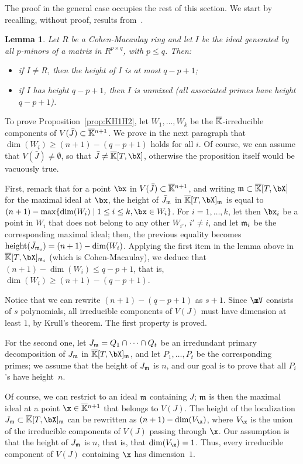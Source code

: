\documentclass[12pt]{article}
\newtheorem{lemma}[definition]{Lemma}
\begin{document}
The proof in the general case occupies the rest of this section. We start by
recalling, without proof, results from~\cite[Section~6]{EN62}.

\begin{lemma}\label{lemma:EN}
  Let $R$ be a Cohen-Macaulay ring and let $I$ be the ideal generated
  by all $p$-minors of a matrix in $R^{p\times q}$,
  with $p \le q$. Then:
  \begin{itemize}
  \item if $I \ne R$, then the height of $I$ is at most $q-p+1$;
  \item if $I$ has height $q-p+1$, then $I$ is unmixed (all associated
    primes have height $q-p+1$).
\end{itemize}
\end{lemma}

To prove Proposition~\ref{prop:KH1H2}, let $W_1,\dots,W_k$ be the
$\overline{\mathbb{K}}$-irreducible components of $V(\bar J)\subset
\overline{\mathbb{K}}{}^{n+1}$. We prove in the next paragraph that $\dim(W_i) \ge
(n+1) -(q-p+1)$ holds for all $i$. Of course, we can assume that
$V(\bar J)\ne \emptyset$, so that $\bar J \ne \KKbar[T,\bX]$, otherwise the
proposition itself would be vacuously true.

First, remark that for a point $\bx$ in $V(\bar J)\subset \overline{\mathbb{K}}{}^{n+1}$, and
writing $\m \subset \KKbar[T,\bX]$ for the maximal ideal at $\bx$, the height of
$\bar J_{\mathfrak{m}}$ in $\KKbar[T,\bX]_\m$ is equal to $(n+1)-\max\{ \dim(W_i) \mid 1 \le i
\le k, \bx \in W_i\}$. For $i=1,\dots,k$, let then $\bx_i$ be a point in $W_i$
that does not belong to any other $W_{i'}$, $i' \ne i$, and let $\mathfrak{m}_i$ be the
corresponding maximal ideal; then, the previous equality becomes ${\rm
  height}(\bar J_{\mathfrak{m}_i})=(n+1)-\dim(W_i)$. Applying the first item in the lemma above
in $\KKbar[T,\bX]_{\m_i}$ (which is Cohen-Macaulay), we deduce that
$(n+1)-\dim(W_i) \le q-p+1$, that is, $\dim(W_i) \ge (n+1) -(q-p+1)$.

Notice that we can rewrite $(n+1)-(q-p+1)$ as $s+1$.  Since $\mV$
consists of $s$ polynomials, all irreducible components of $V(J)$ must
have dimension at least $1$, by Krull's theorem. The first property
 is proved.

For the second one, let $J_{\mathfrak{m}}=Q_1 \cap \cdots \cap Q_t$ be an
irredundant primary decomposition of $J_{\mathfrak{m}}$ in $\KKbar[T,\bX]_\m$, and
let $P_1,\dots,P_t$ be the corresponding primes; we assume that the
height of $J_{\mathfrak{m}}$ is $n$, and our goal is to prove that all $P_i$'s
have height~$n$.

Of course, we can restrict to an ideal $\mathfrak{m}$ containing $J$; $\mathfrak{m}$ is
then the maximal ideal at a point $\x \in \KKbar{}^{n+1}$ that belongs
to $V(J)$. The height of the localization
$J_\m \subset \KKbar[T,\bX]_\m$ can be rewritten as
$(n+1)-\dim(V_\x)$, where $V_\x$ is the union of the irreducible
components of $V(J)$ passing through $\x$. Our assumption 
is that the height of $J_{\mathfrak{m}}$ is $n$, that is, that
$\dim(V_\x)=1$. Thus, every irreducible component of $V(J)$ containing
$\x$ has dimension~$1$.
\end{document}
